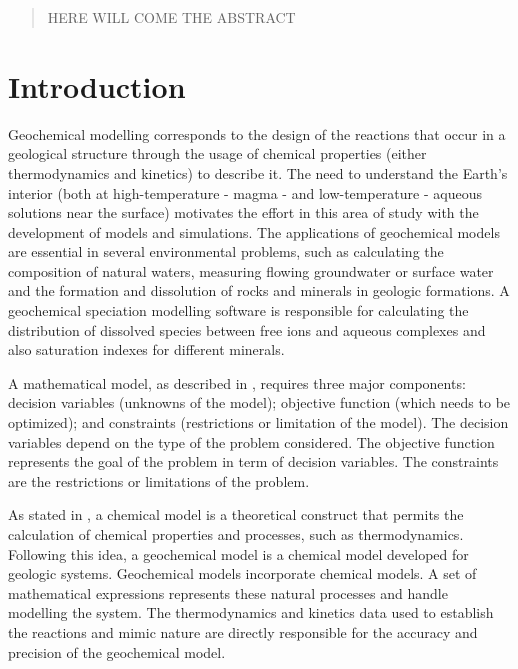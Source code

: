 \documentclass[ppgc,mestrado,english]{iiufrgs}
\begin{document}
\listoffigures



\renewcommand*\abstractname{Abstract}
\begin{abstract}    
HERE WILL COME THE ABSTRACT
\end{abstract}


\chapter{Introduction} 
\label{chapter:intro}


Geochemical modelling corresponds to the design of the reactions that occur in a geological structure through the usage of chemical properties (either thermodynamics and kinetics) to describe it. The need to understand the Earth's interior (both at high-temperature - magma - and low-temperature - aqueous solutions near the surface) motivates the effort in this area of study with the development of models and simulations. The applications of geochemical models are essential in several environmental problems, such as calculating the composition of natural waters, measuring flowing groundwater or surface water and the formation and dissolution of rocks and minerals in geologic formations. A geochemical speciation modelling software is responsible for calculating the distribution of dissolved species between free ions and aqueous complexes and also saturation indexes for different minerals. 


A mathematical model, as described in \cite{Sarker:08}, requires three major components: decision variables (unknowns of the model); objective function (which needs to be optimized); and constraints (restrictions or limitation of the model). The decision variables depend on the type of the problem considered.  The objective function represents the goal of the problem in term of decision variables. The constraints are the restrictions or limitations of the problem.

As stated in \cite{Drever:05}, a chemical model is a theoretical construct that permits the calculation of chemical properties and processes, such as thermodynamics. Following this idea, a geochemical model is a chemical model developed for geologic systems. Geochemical models incorporate chemical models. A set of mathematical expressions represents these natural processes and handle modelling the system. The thermodynamics and kinetics data used to establish the reactions and mimic nature are directly responsible for the accuracy and precision of the geochemical model.
\end{document}
